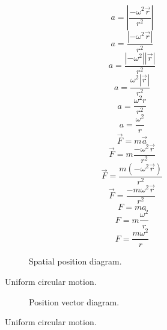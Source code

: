 \documentclass[a4paper,12pt]{report}
\begin{document}
\begin{equation}
a = \left|\frac{-\omega^2 \vec{r}}{r^2}\right|
\end{equation}
\begin{equation}
a = \frac{\left|-\omega^2 \vec{r}\right|}{r^2}
\end{equation}
\begin{equation}
a = \frac{\left|-\omega^2\right| \left|\vec{r}\right|}{r^2}
\end{equation}
\begin{equation}
a = \frac{\omega^2 \left|\vec{r}\right|}{r^2}
\end{equation}
\begin{equation}
a = \frac{\omega^2 r}{r^2}
\end{equation}
\begin{equation}
a = \frac{\omega^2}{r}
\end{equation}
\begin{equation}
\vec{F} = m \vec{a}
\end{equation}
\begin{equation}
\vec{F} = m \frac{-\omega^2 \vec{r}}{r^2}
\end{equation}
\begin{equation}
\vec{F} = \frac{m (-\omega^2 \vec{r})}{r^2}
\end{equation}
\begin{equation}
\vec{F} = \frac{-m \omega^2 \vec{r}}{r^2}
\end{equation}
\begin{equation}
F = ma
\end{equation}
\begin{equation}
F = m \frac{\omega^2}{r}
\end{equation}
\begin{equation}
F = \frac{m \omega^2}{r}
\end{equation}
\clearpage
\begin{figure}[p]
\centering
\begin{subfigure}{\textwidth}
\centering
\resizebox{\textwidth}{!}{}
\caption{Spatial position diagram.}
\end{subfigure}
\caption{Uniform circular motion.}
\end{figure}
\clearpage
\begin{figure}[p]
\centering
\ContinuedFloat
\begin{subfigure}{\textwidth}
\centering
\resizebox{\textwidth}{!}{}
\caption{Position vector diagram.}
\end{subfigure}
\caption{Uniform circular motion.}
\end{figure}
\end{document}
